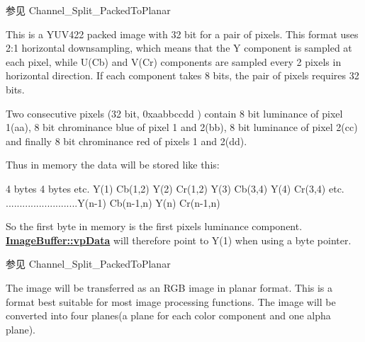 \begin{Desc}
\begin{description}
\begin{DoxySeeAlso}{参见}
Channel\+\_\+\+Split\+\_\+\+Packed\+To\+Planar 
\end{DoxySeeAlso}
\item[{\em 
\hypertarget{group___common_interface_gga456e8aa76e06bb761f27c52141475985a7c6342835b3ba4797d6ed96658d9befd}{ibpf\+Y\+U\+V422\+Packed}\label{group___common_interface_gga456e8aa76e06bb761f27c52141475985a7c6342835b3ba4797d6ed96658d9befd}
}]This is a Y\+U\+V422 packed image with 32 bit for a pair of pixels. This format uses 2\+:1 horizontal downsampling, which means that the Y component is sampled at each pixel, while U(\+Cb) and V(\+Cr) components are sampled every 2 pixels in horizontal direction. If each component takes 8 bits, the pair of pixels requires 32 bits.

Two consecutive pixels (32 bit, 0xaabbccdd ) contain 8 bit luminance of pixel 1(aa), 8 bit chrominance blue of pixel 1 and 2(bb), 8 bit luminance of pixel 2(cc) and finally 8 bit chrominance red of pixels 1 and 2(dd).

Thus in memory the data will be stored like this\+:


\begin{DoxyCode}
4 bytes                   4 bytes                         etc.
Y(1) Cb(1,2) Y(2) Cr(1,2) Y(3)   Cb(3,4)   Y(4) Cr(3,4)   etc.
..........................Y(n-1) Cb(n-1,n) Y(n) Cr(n-1,n)
\end{DoxyCode}


So the first byte in memory is the first pixels luminance component. {\bfseries \hyperlink{struct_image_buffer_ab67c9c21d749e786302c848b508e0673}{Image\+Buffer\+::vp\+Data}} will therefore point to Y(1) when using a byte pointer.

\begin{DoxySeeAlso}{参见}
Channel\+\_\+\+Split\+\_\+\+Packed\+To\+Planar 
\end{DoxySeeAlso}
\item[{\em 
\hypertarget{group___common_interface_gga456e8aa76e06bb761f27c52141475985a7a160122bb22cd781e5605c0de3d3379}{ibpf\+R\+G\+Bx888\+Planar}\label{group___common_interface_gga456e8aa76e06bb761f27c52141475985a7a160122bb22cd781e5605c0de3d3379}
}]The image will be transferred as an R\+G\+B image in planar format. This is a format best suitable for most image processing functions. The image will be converted into four planes(a plane for each color component and one alpha plane).



\end{description}
\end{Desc}

